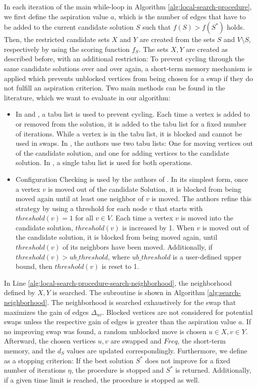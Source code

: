 \documentclass[draft,final]{vutinfth} %
\begin{document}
In each iteration of the main while-loop in Algorithm \ref{alg:local-search-procedure}, we first define the aspiration value $a$, which is the number of edges that have to be added to the current candidate solution $S$ such that $f(S) > f(S^*)$ holds. 
Then, the restricted candidate sets $X$ and $Y$ are created from the sets $S$ and $V \setminus S$, respectively by using the scoring function $f_S$. 
The sets $X, Y$ are created as described before, with an additional restriction: To prevent cycling through the same candidate solutions over and over again, a short-term memory mechanism is applied which prevents unblocked vertices from being chosen for a swap if they do not fulfill an aspiration criterion. 
Two main methods can be found in the literature, which we want to evaluate in our algorithm: 
\begin{itemize}
    \item In \cite{djeddi_extension_2019} and \cite{zhou_opposition-based_2020}, a tabu list is used to prevent cycling. Each time a vertex is added to or removed from the solution, it is added to the tabu list for a fixed number of iterations. While a vertex is in the tabu list, it is blocked and cannot be used in swaps. In \cite{djeddi_extension_2019}, the authors use two tabu lists: One for moving vertices out of the candidate solution, and one for adding vertices to the candidate solution. In \cite{zhou_opposition-based_2020}, a single tabu list is used for both operations. 
    \item Configuration Checking is used by the authors of \cite{chen_nuqclq_2021}. In its simplest form, once a vertex $v$ is moved out of the candidate Solution, it is blocked from being moved again until at least one neighbor of $v$ is moved. The authors refine this strategy by using a threshold for each node $v$ that starts with $\mathit{threshold}(v) = 1$ for all $v \in V$. Each time a vertex $v$ is moved into the candidate solution, $\mathit{threshold}(v)$ is increased by 1. When $v$ is moved out of the candidate solution, it is blocked from being moved again, until $\mathit{threshold}(v)$ of its neighbors have been moved. Additionally, if $\mathit{threshold}(v) > \mathit{ub\_threshold}$, where $\mathit{ub\_threshold}$ is a user-defined upper bound, then $\mathit{threshold}(v)$ is reset to 1. 
\end{itemize}
In Line \ref{alg:local-search-procedure-search-neighborhood}, the neighborhood defined by $X, Y$ is searched. The subroutine is shown in Algorithm \ref{alg:search-neighborhood}. The neighborhood is searched exhaustively for the swap that maximizes the gain of edges $\Delta_{uv}$. Blocked vertices are not considered for potential swaps unless the respective gain of edges is greater than the aspiration value $a$. 
If no improving swap was found, a random unblocked move is chosen $u \in X, v \in Y$. 
Afterward, the chosen vertices $u, v$ are swapped and $\mathit{Freq}$, the short-term memory, and the $d_S$ values are updated correspondingly. 
Furthermore, we define as a stopping criterion: If the best solution $S^*$ does not improve for a fixed number of iterations $\eta$, the procedure is stopped and $S^*$ is returned. Additionally, if a given time limit is reached, the procedure is stopped as well. 
\end{document}
